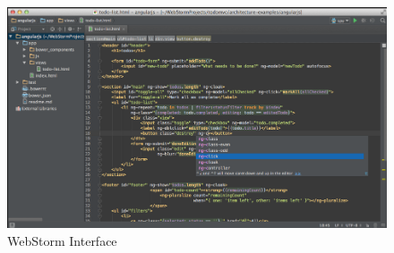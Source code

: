 \begin{figure}[h]
\centering
\includegraphics[width=1\linewidth]{graphics/chapter3/1}
\caption{WebStorm Interface}
\label{}
\end{figure}


